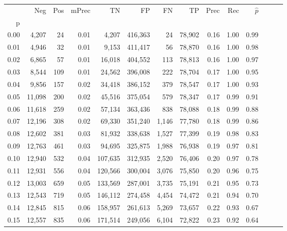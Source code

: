 \begin{tabular}{rrrrrrrrrrrrrr}
\toprule
{} &     Neg &    Pos & mPrec &       TN &       FP &      FN &      TP &  Prec &   Rec & $\hat{p}$ \\
p    &         &        &       &          &          &         &         &       &       &           \\
\midrule
0.00 &   4,207 &     24 &  0.01 &    4,207 &  416,363 &      24 &  78,902 &  0.16 &  1.00 &      0.99 \\
0.01 &   4,946 &     32 &  0.01 &    9,153 &  411,417 &      56 &  78,870 &  0.16 &  1.00 &      0.98 \\
0.02 &   6,865 &     57 &  0.01 &   16,018 &  404,552 &     113 &  78,813 &  0.16 &  1.00 &      0.97 \\
0.03 &   8,544 &    109 &  0.01 &   24,562 &  396,008 &     222 &  78,704 &  0.17 &  1.00 &      0.95 \\
0.04 &   9,856 &    157 &  0.02 &   34,418 &  386,152 &     379 &  78,547 &  0.17 &  1.00 &      0.93 \\
0.05 &  11,098 &    200 &  0.02 &   45,516 &  375,054 &     579 &  78,347 &  0.17 &  0.99 &      0.91 \\
0.06 &  11,618 &    259 &  0.02 &   57,134 &  363,436 &     838 &  78,088 &  0.18 &  0.99 &      0.88 \\
0.07 &  12,196 &    308 &  0.02 &   69,330 &  351,240 &   1,146 &  77,780 &  0.18 &  0.99 &      0.86 \\
0.08 &  12,602 &    381 &  0.03 &   81,932 &  338,638 &   1,527 &  77,399 &  0.19 &  0.98 &      0.83 \\
0.09 &  12,763 &    461 &  0.03 &   94,695 &  325,875 &   1,988 &  76,938 &  0.19 &  0.97 &      0.81 \\
0.10 &  12,940 &    532 &  0.04 &  107,635 &  312,935 &   2,520 &  76,406 &  0.20 &  0.97 &      0.78 \\
0.11 &  12,931 &    556 &  0.04 &  120,566 &  300,004 &   3,076 &  75,850 &  0.20 &  0.96 &      0.75 \\
0.12 &  13,003 &    659 &  0.05 &  133,569 &  287,001 &   3,735 &  75,191 &  0.21 &  0.95 &      0.73 \\
0.13 &  12,543 &    719 &  0.05 &  146,112 &  274,458 &   4,454 &  74,472 &  0.21 &  0.94 &      0.70 \\
0.14 &  12,845 &    815 &  0.06 &  158,957 &  261,613 &   5,269 &  73,657 &  0.22 &  0.93 &      0.67 \\
0.15 &  12,557 &    835 &  0.06 &  171,514 &  249,056 &   6,104 &  72,822 &  0.23 &  0.92 &      0.64 \\

\end{tabular}
